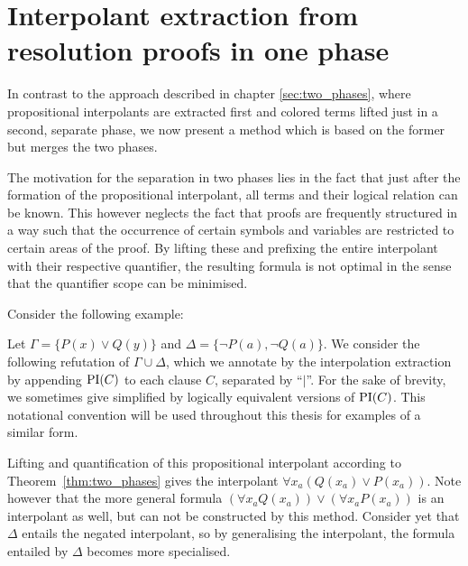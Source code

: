 \chapter{Interpolant extraction from resolution proofs in one phase}
\label{sec:one_phase}

In contrast to the approach described in chapter \ref{sec:two_phases}, where propositional interpolants are extracted first and colored terms lifted just in a second, separate phase, 
we now present a method which is based on the former but merges the two phases.

The motivation for the separation in two phases lies in the fact that just after the formation of the propositional interpolant, all terms and their logical relation can be known.
This however neglects the fact that proofs are frequently structured in a way such that the occurrence of certain symbols and variables are restricted to certain areas of the proof.
By lifting these and prefixing the entire interpolant with their respective quantifier, the resulting formula is not optimal in the sense that the quantifier scope can be minimised.

Consider the following example:

\begin{exa}
	\label{exa:one_phase_motivation}
	Let $\Gamma = \{ P(x) \lor Q(y) \}$ and $\Delta = \{\lnot P(a), \lnot Q(a)\}$.
	We consider the following refutation of $\Gamma \cup \Delta$, which we annotate by the interpolation extraction by appending $\PI(C)$ to each clause $C$, separated by ``$|$''.
	For the sake of brevity, we sometimes give simplified by logically equivalent versions of $\PI(C)$.
	This notational convention will be used throughout this thesis for examples of a similar form.

	\begin{prooftree}
	\end{prooftree}

	Lifting and quantification of this propositional interpolant according to Theorem~\ref{thm:two_phases} gives the interpolant $\forall x_a (Q(x_a) \lor P(x_a))$.
	Note however that the more general formula $(\forall x_a Q(x_a) ) \lor (\forall x_a P(x_a))$ is an interpolant as well, but can not be constructed by this method.
	Consider yet that $\Delta$ entails the negated interpolant, so by generalising the interpolant, the formula entailed by $\Delta$ becomes more specialised.
\end{exa}

